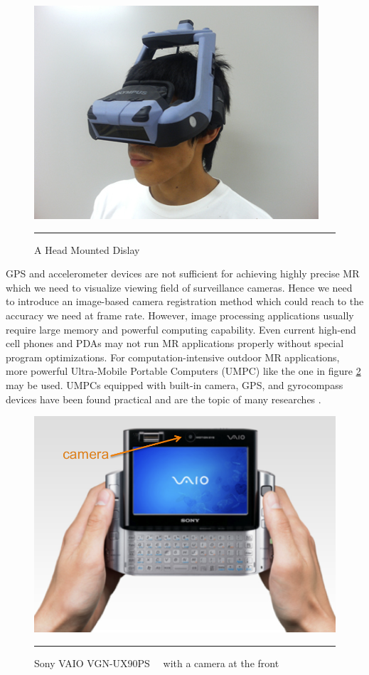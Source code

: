 \begin{figure}[htbp]
	\centering
	\includegraphics{./Primitives/hmd.jpg}
	\rule{35em}{0.5pt}
	\caption[A Head Mounted Dislay]{A Head Mounted Dislay}
	\label{fig:HMD}
\end{figure}

GPS and accelerometer devices are not sufficient for achieving highly precise MR which we need to visualize viewing field of surveillance cameras. Hence we need to introduce an image-based camera registration method which could reach to the accuracy we need at frame rate. However, image processing applications usually require large memory and powerful computing capability. Even current high-end cell phones and PDAs may not run MR applications properly without special program optimizations. For computation-intensive outdoor MR applications, more powerful Ultra-Mobile Portable Computers (UMPC) like the one in figure \ref{fig:VAIO} may be used. UMPCs equipped with built-in camera, GPS, and gyrocompass devices have been found practical and are the topic of many researches \cite{Reference2} \cite{Reference4} \cite{Reference13}.

\begin{figure}[htbp]
	\centering
	\includegraphics{./Primitives/vaio_front.png}
	\rule{35em}{0.5pt}
	\caption[Sony VAIO VGN-UX90PS with a camera at the front]{Sony VAIO VGN-UX90PS 　with a camera at the front}
	\label{fig:VAIO}
\end{figure}

